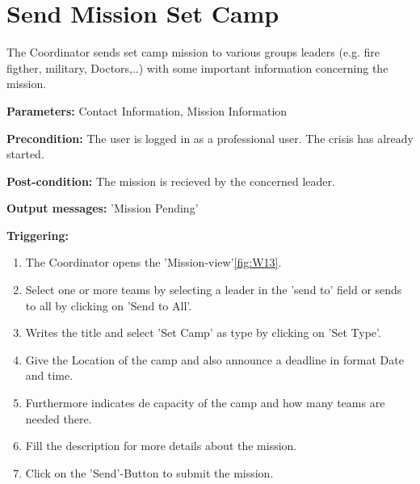 \section{Send Mission Set Camp}
\label{operation:SetCamp}
The Coordinator sends set camp mission to various groups leaders (e.g. fire
figther, military, Doctors,..) with some important information concerning the
mission.\\
\begin{description}
\item \textbf{Parameters:} Contact Information, Mission Information
\item \textbf{Precondition:} The user is logged in as a professional user. The
crisis has already started.  
\item \textbf{Post-condition:} The mission is recieved by the concerned leader.
\item \textbf{Output messages:} 'Mission Pending'
\item \textbf{Triggering:}
\begin{enumerate}
\item The Coordinator opens the 'Mission-view'\ref{fig:W13}.
\item Select one or more teams by selecting a leader in the 'send to' field or
sends to all by clicking on 'Send to All'.
\item Writes the title and select 'Set Camp' as type by clicking on 'Set
Type'.
\item Give the Location of the camp and also announce a deadline in format Date
and time.
\item Furthermore indicates de capacity of the camp and how many teams are
needed there.
\item Fill the description for more details about the mission.
\item Click on the 'Send'-Button to submit the mission.
\end{enumerate}
\end{description}

